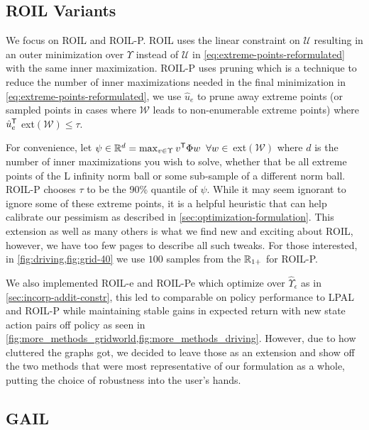 \documentclass[10pt]{article}
\theoremstyle{plain}
\theoremstyle{remark}
\begin{document}
\subsection{ROIL Variants}
\label{sec:roil_variants_appendix}
We focus on ROIL and ROIL-P. ROIL uses the linear constraint on $\mathcal{U}$ resulting in an outer minimization over $\Upsilon$ instead of $\mathcal{U}$ in \eqref{eq:extreme-points-reformulated} with the same inner maximization. ROIL-P uses pruning which is a technique to reduce the number of inner maximizations needed in the final minimization in \eqref{eq:extreme-points-reformulated}, we use $\hat{u}_e$ to prune away extreme points (or sampled points in cases where $\mathcal{W}$ leads to non-enumerable extreme points) where $\hat{u}_e^{\mathsf{T}} $ ext$(\mathcal{W}) \leq \tau$. 

For convenience, let $\psi \in \mathbb{R}^d = \max_{v \in \Upsilon} v^{\mathsf{T}}\Phi w \;\; \forall w \in$ ext$(\mathcal{W})$ where $d$ is the number of inner maximizations you wish to solve, whether that be all extreme points of the L infinity norm ball or some sub-sample of a different norm ball. ROIL-P chooses $\tau$ to be the 90\% quantile of $\psi$. While it may seem ignorant to ignore some of these extreme points, it is a helpful heuristic that can help calibrate our pessimism as described in \cref{sec:optimization-formulation}. This extension as well as many others is what we find new and exciting about ROIL, however, we have too few pages to describe all such tweaks. For those interested, in \cref{fig:driving,fig:grid-40} we use $100$ samples from the $\mathbb{R}_{1+}$ for ROIL-P.

We also implemented ROIL-e and ROIL-Pe which optimize over $\hat{\Upsilon}_\epsilon$ as in \cref{sec:incorp-addit-constr}, this led to comparable on policy performance to LPAL and ROIL-P while maintaining stable gains in expected return with new state action pairs off policy as seen in \cref{fig:more_methods_gridworld,fig:more_methods_driving}. However, due to how cluttered the graphs got, we decided to leave those as an extension and show off the two methods that were most representative of our formulation as a whole, putting the choice of robustness into the user's hands.

\subsection{GAIL}
\end{document}
